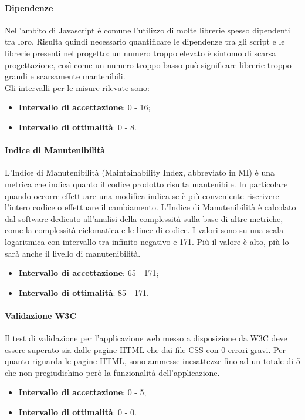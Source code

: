 \paragraph{Dipendenze}
Nell’ambito di Javascript è comune l’utilizzo di molte librerie spesso dipendenti tra loro. Risulta quindi necessario quantificare le dipendenze tra gli script e le librerie presenti nel progetto: un numero troppo elevato è sintomo di scarsa progettazione, così come un numero troppo basso può significare librerie troppo grandi e scarsamente mantenibili.\\
Gli intervalli per le misure rilevate sono:
\begin{itemize}
\item \textbf{Intervallo di accettazione}: 0 - 16;
\item \textbf{Intervallo di ottimalità}: 0 - 8.
\end{itemize}

\paragraph{Indice di Manutenibilità}
L’Indice di Manutenibilità (Maintainability Index, abbreviato in MI) è una metrica che indica quanto il codice prodotto risulta mantenibile. In particolare quando occorre effettuare una modifica indica se è più conveniente riscrivere l’intero codice o effettuare il cambiamento. L’Indice di Manutenibilità è calcolato dal software dedicato all’analisi della complessità sulla base di altre metriche, come la complessità ciclomatica e le linee di codice. I valori sono su una scala logaritmica con intervallo tra infinito negativo e 171. Più il valore è alto, più lo sarà anche il livello di manutenibilità.\\
\begin{itemize}
\item \textbf{Intervallo di accettazione}: 65 - 171;
\item \textbf{Intervallo di ottimalità}: 85 - 171.
\end{itemize}

\paragraph{Validazione W3C}
Il test di validazione per l’applicazione web messo a disposizione da W3C deve essere superato sia dalle pagine HTML che dai file CSS con 0 errori gravi. Per quanto riguarda le pagine HTML, sono ammesse inesattezze fino ad un totale di 5 che non pregiudichino però la funzionalità dell’applicazione.
\begin{itemize}
\item \textbf{Intervallo di accettazione}: 0 - 5;
\item \textbf{Intervallo di ottimalità}: 0 - 0.
\end{itemize}